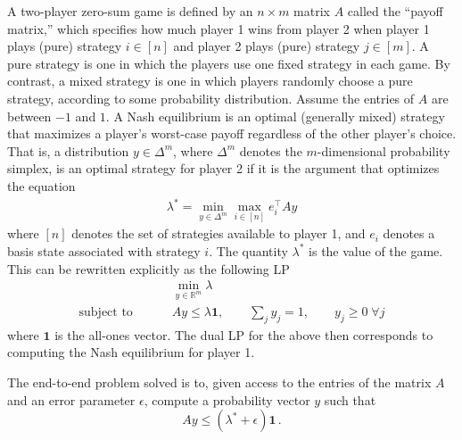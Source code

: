 \begin{refsection}
A two-player zero-sum game is defined by an $n \times m$ matrix $A$ called the ``payoff matrix,'' which specifies how much player 1 wins from player 2 when player 1 plays (pure) strategy $i \in [n]$ and player 2 plays (pure) strategy $j \in [m]$. A pure strategy is one in which the players use one fixed strategy in each game. By contrast, a mixed strategy is one in which players randomly choose a pure strategy, according to some probability distribution. Assume the entries of $A$ are between $-1$ and $1$. A Nash equilibrium is an optimal (generally mixed) strategy that maximizes a player's worst-case payoff regardless of the other player's choice. That is, a distribution $y \in \Delta^m$, where $\Delta^m$ denotes the $m$-dimensional probability simplex, is an optimal strategy for player 2 if it is the argument that optimizes the equation
\begin{equation}
    \begin{split}
        \lambda^* = \min_{y \in \Delta^m} \max_{i \in [n]} e_i^\intercal A y
    \end{split}
\end{equation}
where $[n]$ denotes the set of strategies available to player 1, and $e_i$ denotes a basis state associated with strategy $i$. The quantity $\lambda^*$ is the value of the game. This can be rewritten explicitly \cite{apeldoorn2019QAlgorithmsForZeroSumGames} as the following LP
\begin{equation}
    \begin{split}
        &\min_{y \in \mathbb{R}^m} \lambda \\
        \text{subject to }\qquad & Ay \leq \lambda \mathbf{1}, \qquad \sum_j y_j = 1, \qquad y_j \geq 0\;\forall j
    \end{split}
\end{equation}
where $\mathbf{1}$ is the all-ones vector. 
The dual LP for the above then corresponds to computing the Nash equilibrium for player 1.

The end-to-end problem solved is to, given access to the entries of the matrix $A$ and an error parameter $\epsilon$, compute a probability vector $y$ such that
\begin{equation}
    Ay \leq (\lambda^* + \epsilon) \mathbf{1}\,.
\end{equation}



\end{refsection}
